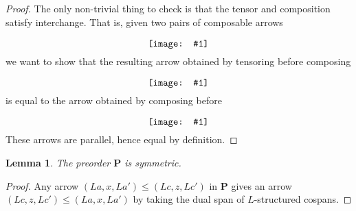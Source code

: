 \documentclass{amsart}
\newcommand{\A}{\cat{A}}
\newcommand{\NonLinArrCat}{\cat{P}}
\newcommand{\X}{\cat{X}}
\newcommand{\cat}[1]{\mathbf{#1}}
\newcommand{\diagram}[1]{\raisebox{-0.5\height}{\texttt{[image: \#1]}}}
\newcommand{\RRewrite}{ \mathbb{R}\mathbf{ewrite} }
\newcommand{\edit}[1]{\textcolor{editcolour}{(#1)}}
\newtheorem{lemma}[theorem]{Lemma}
\theoremstyle{remark}
\theoremstyle{definition}
\begin{document}
\begin{proof}
  The only non-trivial thing to check is that the tensor and
  composition satisfy interchange. That is, given two pairs of
  composable arrows
  \[
    \diagram{diag_nlr_preorder-interchange}
  \]
  we want to show that the resulting arrow obtained by tensoring
  before composing
  \[
    \diagram{diag_nlr_preorder-tensor-compose}
  \]
  is equal to the arrow obtained by composing before
  \[
    \diagram{diag_nlr_preorder-compose-tensor}
  \]
  These arrows are parallel, hence equal by definition.
\end{proof}

\begin{lemma} \label{thm:preord-symm}
  The preorder $ \NonLinArrCat $ is symmetric.
\end{lemma}
 
\begin{proof}
  Any arrow $ ( La , x , La' ) \leq ( Lc , z , Lc' ) $ in
  $ \NonLinArrCat $ gives an arrow
  $ ( Lc , z , Lc' ) \leq ( La , x , La' ) $ by taking the
  dual span of $ L $-structured cospans.
\end{proof}

\end{document}
